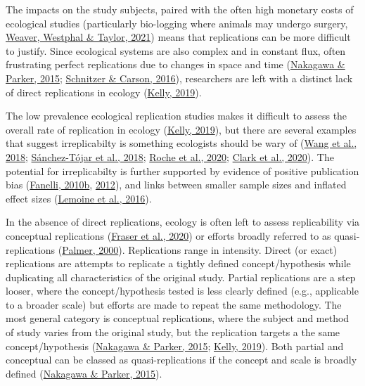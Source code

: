 \documentclass[10pt,a4paper]{article}
\begin{document}
The impacts on the study subjects, paired with the often high monetary costs of ecological studies (particularly bio-logging where animals may undergo surgery, \protect\hyperlink{ref-weaver_technology_2021}{Weaver, Westphal \& Taylor, 2021}) means that replications can be more difficult to justify.
Since ecological systems are also complex and in constant flux, often frustrating perfect replications due to changes in space and time (\protect\hyperlink{ref-nakagawa_replicating_2015}{Nakagawa \& Parker, 2015}; \protect\hyperlink{ref-schnitzer_would_2016}{Schnitzer \& Carson, 2016}), researchers are left with a distinct lack of direct replications in ecology (\protect\hyperlink{ref-kelly_rate_2019}{Kelly, 2019}).

The low prevalence ecological replication studies makes it difficult to assess the overall rate of replication in ecology (\protect\hyperlink{ref-kelly_rate_2019}{Kelly, 2019}), but there are several examples that suggest irreplicabilty is something ecologists should be wary of (\protect\hyperlink{ref-wang_irreproducible_2018}{Wang et al., 2018}; \protect\hyperlink{ref-sanchez-tojar_meta-analysis_2018}{Sánchez-Tójar et al., 2018}; \protect\hyperlink{ref-roche_behavioural_2020}{Roche et al., 2020}; \protect\hyperlink{ref-clark_ocean_2020}{Clark et al., 2020}).
The potential for irreplicabilty is further supported by evidence of positive publication bias (\protect\hyperlink{ref-fanelli_positive_2010}{Fanelli, 2010b}, \protect\hyperlink{ref-fanelli_negative_2012}{2012}), and links between smaller sample sizes and inflated effect sizes (\protect\hyperlink{ref-lemoine_underappreciated_2016}{Lemoine et al., 2016}).

In the absence of direct replications, ecology is often left to assess replicability via conceptual replications (\protect\hyperlink{ref-fraser_role_2020}{Fraser et al., 2020}) or efforts broadly referred to as quasi-replications (\protect\hyperlink{ref-palmer_quasi-replication_2000}{Palmer, 2000}).
Replications range in intensity. Direct (or exact) replications are attempts to replicate a tightly defined concept/hypothesis while duplicating all characteristics of the original study.
Partial replications are a step looser, where the concept/hypothesis tested is less clearly defined (e.g., applicable to a broader scale) but efforts are made to repeat the same methodology.
The most general category is conceptual replications, where the subject and method of study varies from the original study, but the replication targets a the same concept/hypothesis (\protect\hyperlink{ref-nakagawa_replicating_2015}{Nakagawa \& Parker, 2015}; \protect\hyperlink{ref-kelly_rate_2019}{Kelly, 2019}).
Both partial and conceptual can be classed as quasi-replications if the concept and scale is broadly defined (\protect\hyperlink{ref-nakagawa_replicating_2015}{Nakagawa \& Parker, 2015}).
\end{document}
